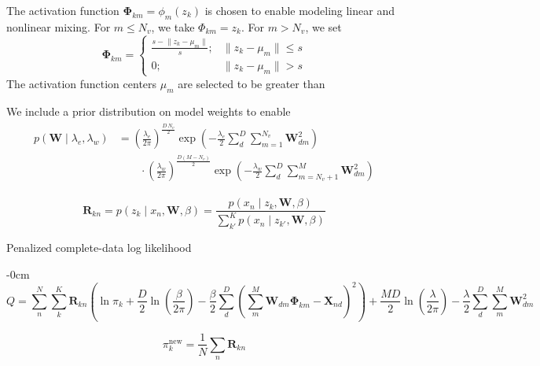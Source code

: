 \documentclass[remotesensing,article,submit,pdftex,moreauthors]{Definitions/mdpi}
\begin{document}
The activation function $\mathbf{\Phi}_{km} = \phi_m(z_k)$ is chosen to enable modeling linear and nonlinear mixing. For $m \leq N_v$, we take $\Phi_{km} = z_k$. For $m > N_v$, we set
\begin{equation}\label{eq:act-function}
    \mathbf{\Phi}_{km} = \begin{cases}
        \frac{s - \lVert z_k - \mu_m \rVert}{s}; & \lVert z_k - \mu_m \rVert \leq s \\
        0; & \lVert z_k - \mu_m \rVert > s
    \end{cases}
\end{equation}
The activation function centers $\mu_m$ are selected to be greater than 

We include a prior distribution on model weights to enable
\begin{align}\label{eq:weight-prior}
\begin{split}
    p(\mathbf{W} \mid \lambda_e, \lambda_w) &= \left(\frac{\lambda_e}{2\pi}\right)^{\frac{D\,N_v}{2}}\exp\left(-\frac{\lambda_e}{2}\sum\limits_d^D\sum\limits_{m=1}^{N_v}\mathbf{W}_{dm}^2 \right)\\ 
    & \qquad \cdot \left(\frac{\lambda_w}{2\pi}\right)^{\frac{D(M-N_v)}{2}}\exp\left(-\frac{\lambda_w}{2}\sum\limits_d^D\sum_{m=N_v+1}^M \mathbf{W}_{dm}^2\right)
\end{split}
\end{align}

\begin{equation}\label{eq:responsibility}
    \mathbf{R}_{kn}  = p(z_k \mid x_n, \mathbf{W}, \beta) = \dfrac{p(x_n \mid z_k, \mathbf{W}, \beta)}{\sum\limits_{k'}^K p(x_n \mid z_{k'}, \mathbf{W}, \beta)}
\end{equation}

Penalized complete-data log likelihood
\begin{adjustwidth}{-\extralength}{0cm}
\begin{equation}\label{eq:complete-data-llh}
    Q = \sum\limits_n^N\sum\limits_k^K \mathbf{R}_{kn} \left(\ln\pi_k + \frac{D}{2}\ln\left(\frac{\beta}{2\pi}\right) - \frac{\beta}{2}\sum\limits_d^D\left(\sum\limits_m^M \mathbf{W}_{dm}\mathbf{\Phi}_{km} - \mathbf{X}_{nd}\right)^2\right) + \frac{MD}{2}\ln\left(\frac{\lambda}{2\pi}\right) - \frac{\lambda}{2}\sum\limits_d^D \sum\limits_m^M \mathbf{W}_{dm}^2
\end{equation}
\end{adjustwidth}


\begin{equation}\label{eq:pi-update}
    \pi_k^{\text{new}}  = \frac{1}{N}\sum_n \mathbf{R}_{kn}
\end{equation}
\end{document}
